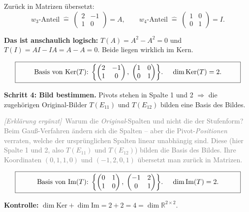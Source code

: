 \documentclass[a4paper,12pt]{article}
\newcommand{\erglerk}{\textcolor{gray}{\small\textit{[Erkl\"arung erg\"anzt]}}}
\begin{document}
Zur\"uck in Matrizen \"ubersetzt:
\[
w_3\text{-Anteil} \;\widehat{=}\; \begin{pmatrix} 2 & -1 \\ 1 & 0 \end{pmatrix} = A, \qquad
w_4\text{-Anteil} \;\widehat{=}\; \begin{pmatrix} 1 & 0 \\ 0 & 1 \end{pmatrix} = I.
\]

\textbf{Das ist anschaulich logisch:} $T(A) = A^2 - A^2 = 0$ und $T(I) = AI - IA = A - A = 0$. Beide liegen wirklich im Kern.

\[
\fbox{\parbox{0.93\textwidth}{\centering
Basis von $\text{Ker}(T)$: $\left\{\begin{pmatrix} 2 & -1 \\ 1 & 0 \end{pmatrix},\; \begin{pmatrix} 1 & 0 \\ 0 & 1 \end{pmatrix}\right\}$. \quad $\dim \text{Ker}(T) = 2$.
}}
\]

\textbf{Schritt 4: Bild bestimmen.} Pivots stehen in Spalte 1 und 2 $\Rightarrow$ die zugeh\"origen Original-Bilder $T(E_{11})$ und $T(E_{12})$ bilden eine Basis des Bildes.

\erglerk\ \textcolor{gray}{\small Warum die \emph{Original}-Spalten und nicht die der Stufenform? Beim Gau\ss-Verfahren \"andern sich die Spalten -- aber die Pivot-\emph{Positionen} verraten, welche der urspr\"unglichen Spalten linear unabh\"angig sind. Diese (hier Spalte 1 und 2, also $T(E_{11})$ und $T(E_{12})$) bilden die Basis des Bildes. Ihre Koordinaten $(0,1,1,0)$ und $(-1,2,0,1)$ \"ubersetzt man zur\"uck in Matrizen.}

\[
\fbox{\parbox{0.93\textwidth}{\centering
Basis von $\text{Im}(T)$: $\left\{\begin{pmatrix} 0 & 1 \\ 1 & 0 \end{pmatrix},\; \begin{pmatrix} -1 & 2 \\ 0 & 1 \end{pmatrix}\right\}$. \quad $\dim \text{Im}(T) = 2$.
}}
\]

\textbf{Kontrolle:} $\dim \text{Ker} + \dim \text{Im} = 2 + 2 = 4 = \dim \mathbb{R}^{2\times 2}$. \checkmark
\end{document}
